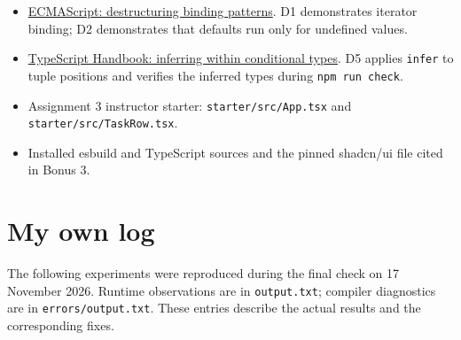 \begin{itemize}
\tightlist
\item
  \href{https://tc39.es/ecma262/multipage/ecmascript-language-statements-and-declarations.html\#sec-destructuring-binding-patterns}{ECMAScript: destructuring binding patterns}.
  D1 demonstrates iterator binding; D2 demonstrates that defaults run only for undefined values.
\item
  \href{https://www.typescriptlang.org/docs/handbook/2/conditional-types.html\#inferring-within-conditional-types}{TypeScript Handbook: inferring within conditional types}.
  D5 applies \passthrough{\lstinline!infer!} to tuple positions and verifies the inferred types during \passthrough{\lstinline!npm run check!}.
\item
  Assignment 3 instructor starter: \passthrough{\lstinline!starter/src/App.tsx!} and \passthrough{\lstinline!starter/src/TaskRow.tsx!}.
\item
  Installed esbuild and TypeScript sources and the pinned shadcn/ui file cited in Bonus 3.
\end{itemize}

\section{My own log}\label{my-own-log}

The following experiments were reproduced during the final check on 17 November 2026.
Runtime observations are in \passthrough{\lstinline!output.txt!}; compiler diagnostics are in \passthrough{\lstinline!errors/output.txt!}.
These entries describe the actual results and the corresponding fixes.

